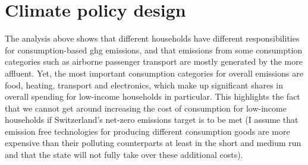 \documentclass[a4paper,11pt,abstract=true]{scrartcl}
\begin{document}

\clearpage

\section{Climate policy design}
\label{sec:climpol}

The analysis above shows that different households have different responsibilities for con\-sump\-tion-based \ac{ghg} emissions, and that emissions from some consumption categories such as airborne passenger transport are mostly generated by the more affluent.
Yet, the most important consumption categories for overall emissions are food, heating, transport and electronics, which make up significant shares in overall spending for low-income households in particular.
This highlights the fact that we cannot get around increasing the cost of consumption for low-income households if Switzerland's net-zero emissions target is to be met (I assume that emission free technologies for producing different consumption goods are more expensive than their polluting counterparts at least in the short and medium run and that the state will not fully take over these additional costs).
\end{document}
